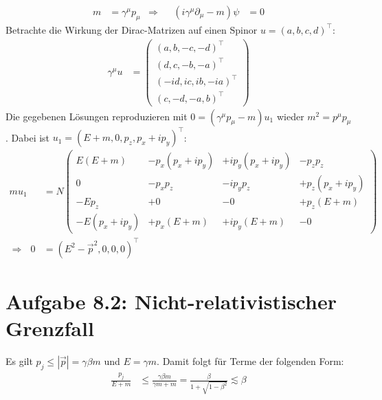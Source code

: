 \documentclass[a4paper,12pt]{article}
\newcommand{\kla}{}
\begin{document}
\begin{align*}
m&=\gamma^\mu p_\mu &\Rightarrow && (i\gamma^\mu\partial_\mu - m)\psi&=0
\end{align*}
Betrachte die Wirkung der Dirac-Matrizen auf einen Spinor $u=(a,b,c,d)^\top$:
\begin{align*}
\gamma^\mu u&=\begin{pmatrix}
(a, b, -c, -d)^\top \\ (d, c, -b, -a)^\top \\
(-id, ic, ib, -ia)^\top \\ (c, -d, -a, b)^\top
\end{pmatrix}
\end{align*}
Die gegebenen Lösungen reproduzieren mit $0=\kla\left( {\gamma^\mu p_\mu -m} \right)u_1$ wieder $m^2=p^\mu p_\mu$. Dabei ist $u_1=(E+m,0,p_z,p_x+ip_y)^\top$:
\begin{align*}
mu_1&=N\begin{pmatrix}
E(E+m)&-p_x(p_x+ip_y)&+ip_y(p_x+ip_y)& -p_zp_z\\
 0&-p_xp_z& -ip_yp_z& +p_z(p_x+ip_y)\\
  -Ep_z&+0 &-0& +p_z(E+m) \\
   -E(p_x+ip_y)&+p_x(E+m)& +ip_y(E+m)&-0
\end{pmatrix}\\
\Rightarrow\ \ \ 0&=(E^2-\vec{p}^2,0,0,0)^\top
\end{align*}
\section*{Aufgabe 8.2: Nicht-relativistischer Grenzfall}
Es gilt $p_j\le |\vec{p}|=\gamma\beta m$ und $E=\gamma m$. Damit folgt für Terme der folgenden Form:
\begin{align*}
\frac{p_j}{E+m}&\le \frac{\gamma\beta m}{\gamma m +m}=\frac{\beta}{1+\sqrt{1-\beta^2}}\lesssim\beta
\end{align*}
\end{document}
